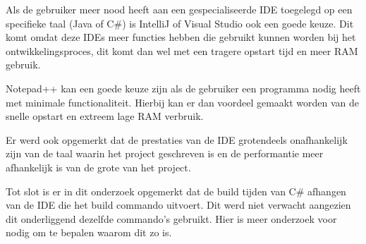 Als de gebruiker meer nood heeft aan een gespecialiseerde IDE toegelegd op een specifieke taal (Java of C\#) is IntelliJ of Visual Studio ook een goede keuze. Dit komt omdat deze IDEs meer functies hebben die gebruikt kunnen worden bij het ontwikkelingsproces, dit komt dan wel met een tragere opstart tijd en meer RAM gebruik.

Notepad++ kan een goede keuze zijn als de gebruiker een programma nodig heeft met minimale functionaliteit. Hierbij kan er dan voordeel gemaakt worden van de snelle opstart en extreem lage RAM verbruik.

Er werd ook opgemerkt dat de prestaties van de IDE grotendeels onafhankelijk zijn van de taal waarin het project geschreven is en de performantie meer afhankelijk is van de grote van het project.

Tot slot is er in dit onderzoek opgemerkt dat de build tijden van C\# afhangen van de IDE die het build commando uitvoert. Dit werd niet verwacht aangezien dit onderliggend dezelfde commando's gebruikt. Hier is meer onderzoek voor nodig om te bepalen waarom dit zo is.
